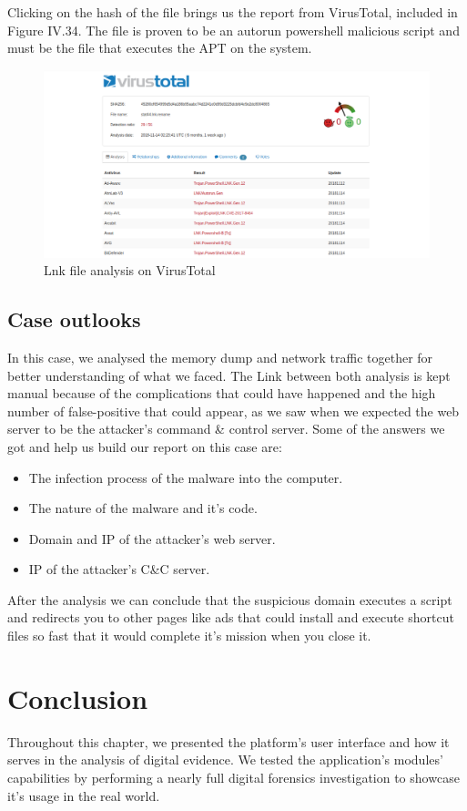 Clicking on the hash of the file brings us the report from VirusTotal, included in Figure IV.34. The file is proven to be an autorun powershell malicious script and must be the file that executes the APT on the system.
\begin{figure}[H]
\centering
\includegraphics[width=0.9\columnwidth]{Figures/34.png}
\caption{Lnk file analysis on VirusTotal}
\end{figure}
\subsection{Case outlooks}
In this case, we analysed the memory dump and network traffic together for better understanding of what we faced. The Link between both analysis is kept manual because of the complications that could have happened and the high number of false-positive that could appear, as we saw when we expected the web server to be the attacker's command \& control server. Some of the answers we got and help us build our report on this case are:
\begin{itemize}
    \item The infection process of the malware into the computer.
    \item The nature of the malware and it's code.
    \item Domain and IP of the attacker's web server.
    \item IP of the attacker's C\&C server.
\end{itemize}
After the analysis we can conclude that the suspicious domain executes a script and redirects you to other pages like ads that could install and execute shortcut files so fast that it would complete it's mission when you close it.
\section*{Conclusion}
Throughout this chapter, we presented the platform's user interface and how it serves in the analysis of digital evidence. We tested the application's modules' capabilities by performing a nearly full digital forensics investigation to showcase it's usage in the real world.